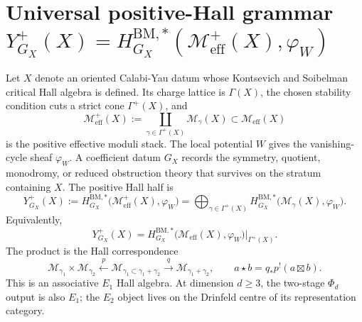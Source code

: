 \providecommand{\C}{\mathbb{C}}
\providecommand{\Z}{\mathbb{Z}}
\providecommand{\N}{\mathbb{N}}
\providecommand{\R}{\mathbb{R}}
\providecommand{\Q}{\mathbb{Q}}
\providecommand{\gl}{\mathfrak{gl}}
\providecommand{\bowtie}{\bowtie}
\providecommand{\CoHA}{\mathrm{CoHA}}
\providecommand{\Hilb}{\mathrm{Hilb}}
\providecommand{\Mbps}{\mathcal{M}^{+}_{\mathrm{eff}}}
\providecommand{\Meff}{\mathcal{M}_{\mathrm{eff}}}
\providecommand{\Yplus}{Y^{+}}
\providecommand{\Yminus}{Y^{-}}
\providecommand{\Yzero}{Y^{0}}
\providecommand{\Heq}{H^{*}_{\mathrm{eq}}}
\providecommand{\kchir}{\kappa_{\mathrm{ch}}}
\providecommand{\kcat}{\kappa_{\mathrm{cat}}}
\providecommand{\kBKM}{\kappa_{\mathrm{BKM}}}
\providecommand{\kfib}{\kappa_{\mathrm{fiber}}}
\providecommand{\bps}{\mathrm{BPS}}
\providecommand{\red}{\mathrm{red}}
\section*{Universal positive-Hall grammar
         $\Yplus_{G_X}(X)=H^{\mathrm{BM},*}_{G_X}(\Mbps(X),\varphi_{W})$}
\label{sec:universal-Yplus-grammar}

Let $X$ denote an oriented Calabi-Yau datum whose Kontsevich and
Soibelman critical Hall algebra is defined.  Its charge lattice is
$\Gamma(X)$, the chosen stability condition cuts a strict cone
$\Gamma^{+}(X)$, and
\[
  \Mbps(X)
  :=
  \coprod_{\gamma \in \Gamma^{+}(X)} \mathcal{M}_{\gamma}(X)
  \subset
  \Meff(X)
\]
is the positive effective moduli stack.  The local potential $W$ gives
the vanishing-cycle sheaf $\varphi_{W}$.  A coefficient datum
$G_X$ records the symmetry, quotient, monodromy, or reduced obstruction
theory that survives on the stratum containing $X$.  The positive Hall
half is
\[
  \Yplus_{G_X}(X)
  :=
  H^{\mathrm{BM}, *}_{G_X}
  \bigl(\Mbps(X), \varphi_{W}\bigr)
  =
  \bigoplus_{\gamma \in \Gamma^{+}(X)}
  H^{\mathrm{BM}, *}_{G_X}
  \bigl(\mathcal{M}_{\gamma}(X), \varphi_{W}\bigr).
\]
Equivalently,
\[
  \Yplus_{G_X}(X)
  =
  H^{\mathrm{BM}, *}_{G_X}
  \bigl(\Meff(X), \varphi_{W}\bigr)\big|_{\Gamma^{+}(X)}.
\]
The product is the Hall correspondence
\[
  \mathcal{M}_{\gamma_{1}} \times \mathcal{M}_{\gamma_{2}}
  \xleftarrow{\;p\;}
  \mathcal{M}_{\gamma_{1} \subset \gamma_{1}+\gamma_{2}}
  \xrightarrow{\;q\;}
  \mathcal{M}_{\gamma_{1}+\gamma_{2}},
  \qquad
  a \star b = q_{*}p^{!}(a \boxtimes b).
\]
This is an associative $E_{1}$ Hall algebra.  At dimension $d \geq 3$,
the two-stage $\Phi_d$ output is also $E_{1}$; the $E_{2}$ object lives
on the Drinfeld centre of its representation category.

